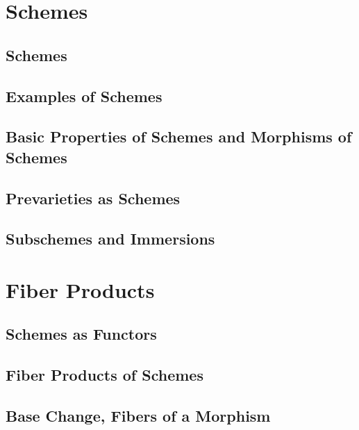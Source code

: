 \documentclass[11pt, a4paper]{article}
\begin{document}
\section{Schemes}

\subsection{Schemes}

\subsection{Examples of Schemes}

\subsection{Basic Properties of Schemes and Morphisms of Schemes}

\subsection{Prevarieties as Schemes}

\subsection{Subschemes and Immersions}

\section{Fiber Products}

\subsection{Schemes as Functors}

\subsection{Fiber Products of Schemes}

\subsection{Base Change, Fibers of a Morphism}
\end{document}
